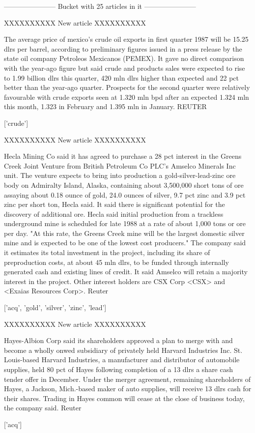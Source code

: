 \documentclass{article}
\begin{document}
\begin{pythonOutput}
['earn']

-----------------------
Bucket with 25 articles in it
-----------------------


XXXXXXXXXX
New article
XXXXXXXXXX

The average price of mexico's crude
oil exports in first quarter 1987 will be 15.25 dlrs per
barrel, according to preliminary figures issued in a press
release by the state oil company Petroleos Mexicanos (PEMEX).
    It gave no direct comparison with the year-ago figure but
said crude and products sales were expected to rise to 1.99
billion dlrs this quarter, 420 mln dlrs higher than expected
and 22 pct better than the year-ago quarter.
    Prospects for the second quarter were relatively favourable
with crude exports seen at 1.320 mln bpd after an expected
1.324 mln this month, 1.323 in February and 1.395 mln in
January.
 REUTER

['crude']

XXXXXXXXXX
New article
XXXXXXXXXX

Hecla Mining Co said it
has agreed to purchase a 28 pct interest in the Greens Creek
Joint Venture from British Petroleum Co PLC's Amselco Minerals
Inc unit.
    The venture expects to bring into production a
gold-silver-lead-zinc ore body on Admiralty Island, Alaska,
containing about 3,500,000 short tons of ore assaying about
0.18 ounce of gold, 24.0 ounces of silver, 9.7 pct zinc and 3.9
pct zinc per short ton, Hecla said.  It said there is
significant potential for the discovery of additional ore.
    Hecla said initial production from a trackless underground
mine is scheduled for late 1988 at a rate of about 1,000 tons
or ore per day.  "At this rate, the Greens Creek mine will be
the largest domestic silver mine and is expected to be one of
the lowest cost producers."
    The company said it estimates its total investment in the
project, including its share of preproduction costs, at about
45 mln dlrs, to be funded through internally generated cash and
existing lines of credit.  It said Amselco will retain a
majority interest in the project.  Other interest holders are
CSX Corp <CSX> and <Exaias Resources Corp>.
 Reuter

['acq', 'gold', 'silver', 'zinc', 'lead']

XXXXXXXXXX
New article
XXXXXXXXXX

Hayes-Albion Corp said its shareholders
approved a plan to merge with and become a wholly onwed
subsidiary of privately held Harvard Industries Inc.
    St. Louis-based Harvard Industries, a manufacturer and
distributor of automobile supplies, held 80 pct of Hayes
following completion of a 13 dlrs a share cash tender offer in
December.
    Under the merger agreement, remaining shareholders of
Hayes, a Jackson, Mich.-based maker of auto supplies, will
receive 13 dlrs cash for their shares.
    Trading in Hayes common will cease at the close of business
today, the company said.
 Reuter

['acq']

\end{pythonOutput}
\end{document}
